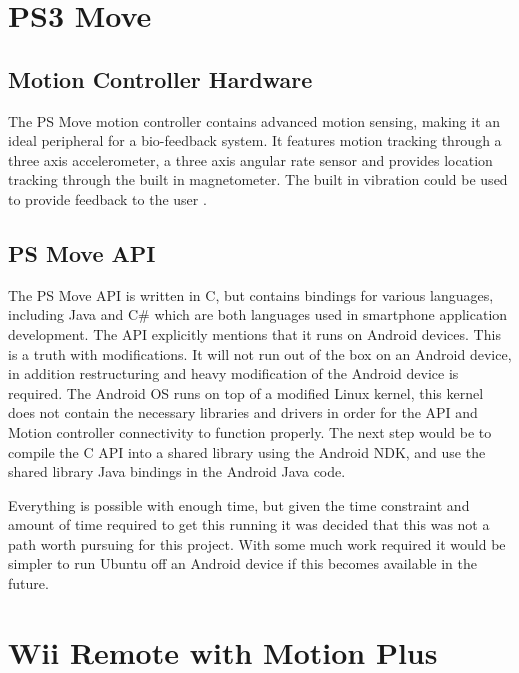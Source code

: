 \documentclass[11pt,twoside,a4paper]{report}
\begin{document}
\section{PS3 Move}

\subsection{Motion Controller Hardware}
The PS Move motion controller contains advanced motion sensing, making it an ideal peripheral for a bio-feedback system. It features motion tracking through a three axis accelerometer, a three axis angular rate sensor and provides location tracking through the built in magnetometer. The built in vibration could be used to provide feedback to the user \cite{psMoveTech}.

\subsection{PS Move API}

The PS Move API \cite{PSMoveAPI} is written in C, but contains bindings for various languages, including Java and C\# which are both languages used in smartphone application development. The API explicitly mentions that it runs on Android devices. This is a truth with modifications. It will not run out of the box on an Android device, in addition restructuring and heavy modification of the Android device is required.  The Android OS runs on top of a modified Linux kernel, this kernel does not contain the necessary libraries and drivers in order for the API and Motion controller connectivity to function properly. %
The next step would be to compile the C API into a shared library using the Android NDK, and use the shared library Java bindings in the Android Java code.

Everything is possible with enough time, but given the time constraint and amount of time required to get this running it was decided that this was not a path worth pursuing for this project. With some much work required it would be simpler to run Ubuntu off an Android device if this becomes available in the future. \cite{ubuntuAndroid}

\section{Wii Remote with Motion Plus}
\end{document}
